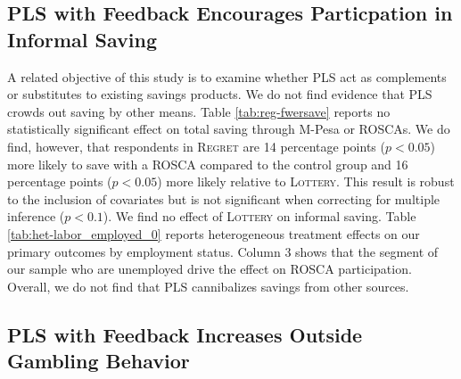 \documentclass[12pt]{article}
\begin{document}

	\subsection{PLS with Feedback Encourages Particpation in Informal Saving}

		A related objective of this study is to examine whether PLS act as complements or substitutes to existing savings products. We do not find evidence that PLS crowds out saving by other means. Table \ref{tab:reg-fwersave} reports no statistically significant effect on total saving through M-Pesa or ROSCAs. We do find, however, that respondents in \textsc{Regret} are 14 percentage points ($p < 0.05$) more likely to save with a ROSCA compared to the control group and 16 percentage points ($p < 0.05$) more likely relative to \textsc{Lottery}. This result is robust to the inclusion of covariates but is not significant when correcting for multiple inference ($p < 0.1$). We find no effect of \textsc{Lottery} on informal saving. Table \ref{tab:het-labor_employed_0} reports heterogeneous treatment effects on our primary outcomes by employment status. Column 3 shows that the segment of our sample who are unemployed drive the effect on ROSCA participation. Overall, we do not find that PLS cannibalizes savings from other sources.


		
		

	\subsection{PLS with Feedback Increases Outside Gambling Behavior}
\end{document}
